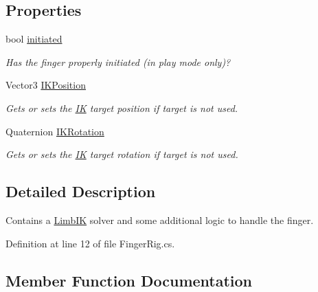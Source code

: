 \subsection*{Properties}
\begin{DoxyCompactItemize}
\item 
bool \mbox{\hyperlink{class_root_motion_1_1_final_i_k_1_1_finger_acb849481d6e0992851e8dfd2315291fd}{initiated}}
\begin{DoxyCompactList}\small\item\em Has the finger properly initiated (in play mode only)? \end{DoxyCompactList}\item 
Vector3 \mbox{\hyperlink{class_root_motion_1_1_final_i_k_1_1_finger_ae16402119be9f6353f90c65a29a98195}{I\+K\+Position}}
\begin{DoxyCompactList}\small\item\em Gets or sets the \mbox{\hyperlink{class_root_motion_1_1_final_i_k_1_1_i_k}{IK}} target position if target is not used. \end{DoxyCompactList}\item 
Quaternion \mbox{\hyperlink{class_root_motion_1_1_final_i_k_1_1_finger_a23f205bf349624ed830df25e7e9e7bb9}{I\+K\+Rotation}}
\begin{DoxyCompactList}\small\item\em Gets or sets the \mbox{\hyperlink{class_root_motion_1_1_final_i_k_1_1_i_k}{IK}} target rotation if target is not used. \end{DoxyCompactList}\end{DoxyCompactItemize}


\subsection{Detailed Description}
Contains a \mbox{\hyperlink{class_root_motion_1_1_final_i_k_1_1_limb_i_k}{Limb\+IK}} solver and some additional logic to handle the finger. 



Definition at line 12 of file Finger\+Rig.\+cs.



\subsection{Member Function Documentation}
\mbox{\label{class_root_motion_1_1_final_i_k_1_1_finger_aa660ea3d2f1dc6b02cf1c402d8f441b5}} 
